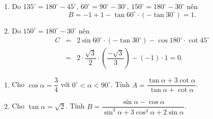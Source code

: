 \begin{vd}
{\begin{enumerate}
\begin{eqnarray*}
	\end{eqnarray*}
\item Do $135^\circ=180^\circ-45^\circ$, $60^\circ=90^\circ-30^\circ$, $150^\circ=180^\circ-30^\circ$ nên
$$B=-1+1-\tan 60^\circ\cdot(-\tan 30^\circ)=1.$$
\item Do $150^\circ=180^\circ-30^\circ$ nên
\allowdisplaybreaks
\begin{eqnarray*}
	C&=&2\sin 60^\circ\cdot(-\tan 30^\circ)-\cos 180^\circ\cdot\cot 45^\circ\\
	&=&2\cdot\dfrac{\sqrt{3}}{2}\cdot\left(\dfrac{-\sqrt{3}}{3}\right)-(-1)\cdot 1=0.
\end{eqnarray*}
\end{enumerate}
}
\end{vd}

\begin{vd}%
	\begin{enumerate}
		\item Cho $\cos\alpha=\dfrac{3}{4}$ với $0^\circ<\alpha<90^\circ$. Tính $A=\dfrac{\tan\alpha+3\cot\alpha}{\tan\alpha+\cot\alpha}$.
		\item Cho $\tan\alpha=\sqrt{2}$. Tính $B=\dfrac{\sin\alpha-\cos\alpha}{\sin^3\alpha+3\cos^3\alpha+2\sin\alpha}$.
	\end{enumerate}
\end{vd}
\baitaptl
